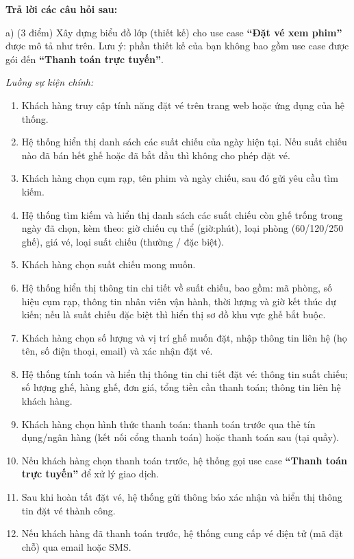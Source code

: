 \documentclass[11pt,a4paper]{article}
\begin{document}
\noindent\textbf{Trả lời các câu hỏi sau:}

\noindent a) (3 điểm) Xây dựng biểu đồ lớp (thiết kế) cho use case \textbf{``Đặt vé xem phim''} được mô tả như trên. Lưu ý: phần thiết kế của bạn không bao gồm use case được gói đến \textbf{``Thanh toán trực tuyến''}.

\par\nobreak\vspace*{0pt}
{\itshape\nobreak Luồng sự kiện chính:}
\begin{enumerate}[leftmargin=1.05cm]
\item Khách hàng truy cập tính năng đặt vé trên trang web hoặc ứng dụng của hệ thống.
\item Hệ thống hiển thị danh sách các suất chiếu của ngày hiện tại. Nếu suất chiếu nào đã bán hết ghế hoặc đã bắt đầu thì không cho phép đặt vé.
\item Khách hàng chọn cụm rạp, tên phim và ngày chiếu, sau đó gửi yêu cầu tìm kiếm.
\item Hệ thống tìm kiếm và hiển thị danh sách các suất chiếu còn ghế trống trong ngày đã chọn, kèm theo: giờ chiếu cụ thể (giờ:phút), loại phòng (60/120/250 ghế), giá vé, loại suất chiếu (thường / đặc biệt).
\item Khách hàng chọn suất chiếu mong muốn.
\item Hệ thống hiển thị thông tin chi tiết về suất chiếu, bao gồm: mã phòng, số hiệu cụm rạp, thông tin nhân viên vận hành, thời lượng và giờ kết thúc dự kiến; nếu là suất chiếu đặc biệt thì hiển thị sơ đồ khu vực ghế bắt buộc.
\item Khách hàng chọn số lượng và vị trí ghế muốn đặt, nhập thông tin liên hệ (họ tên, số điện thoại, email) và xác nhận đặt vé.
\item Hệ thống tính toán và hiển thị thông tin chi tiết đặt vé: thông tin suất chiếu; số lượng ghế, hàng ghế, đơn giá, tổng tiền cần thanh toán; thông tin liên hệ khách hàng.
\item Khách hàng chọn hình thức thanh toán: thanh toán trước qua thẻ tín dụng/ngân hàng (kết nối cổng thanh toán) hoặc thanh toán sau (tại quầy).
\item Nếu khách hàng chọn thanh toán trước, hệ thống gọi use case \textbf{``Thanh toán trực tuyến''} để xử lý giao dịch.
\item Sau khi hoàn tất đặt vé, hệ thống gửi thông báo xác nhận và hiển thị thông tin đặt vé thành công.
\item Nếu khách hàng đã thanh toán trước, hệ thống cung cấp vé điện tử (mã đặt chỗ) qua email hoặc SMS.
\end{enumerate}
\end{document}
